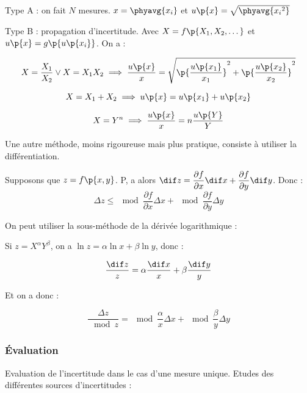     \begin{enumerate}
        \itt Type A : on fait $N$ mesures. $x = \phyavg{x_i}$ et $u\p{x} = \sqrt{\phyavg{{x_i}^2}}$
        
        \itt Type B : propagation d'incertitude. Avec $X = f\p{X_1, X_2, \dots}$ et $u\p{x} = g\p{u\p{x_i}}$. On a :
        
        \[ X = \dfrac{X_1}{X_2} \lor X = X_1X_2\implies \dfrac{u\p{x}}{x} = \sqrt{\p{\dfrac{u\p{x_1}}{x_1}}^2 + \p{\dfrac{u\p{x_2}}{x_2}}^2}\]
        
        \[ X = X_1 + X_2 \implies u\p{x} = u\p{x_1} + u\p{x_2}\]
        
        \[ X = Y^n \implies \dfrac{u\p{x}}{x} = n\dfrac{u\p{Y}}{Y}\]
        
        \itt Une autre méthode, moins rigoureuse mais plus pratique, consiste à utiliser la différentiation.
    
        Supposons que $z = f\p{x, y}$. P, a alors $\dif z = \dfrac{\partial f}{\partial x}\dif x + \dfrac{\partial f}{\partial y}\dif y$. Donc :
        \[ \Delta z \leq \mod{\dfrac{\partial f}{\partial x}}\Delta x + \mod{\dfrac{\partial f}{\partial y}}\Delta y\]
        
        \itt On peut utiliser la sous-méthode de la dérivée logarithmique :
        
        Si $z = X^\alpha Y^\beta$, on a $\ln{z} = \alpha\ln{x} + \beta\ln{y}$, donc :
        
        \[ \dfrac{\dif z}{z} = \alpha \dfrac{\dif x}{x} + \beta \dfrac{\dif y}{y} \]
        
        Et on a donc :
        
        \[ \dfrac{\Delta z}{\mod{z}} = \mod{\dfrac{\alpha}{x}}\Delta x + \mod{\dfrac{\beta}{y}}\Delta y\]
    \end{enumerate}
    
    \subsubsection{Évaluation}
    
    Evaluation de l'incertitude dans le cas d'une mesure unique. Etudes des différentes sources d'incertitudes :
    
